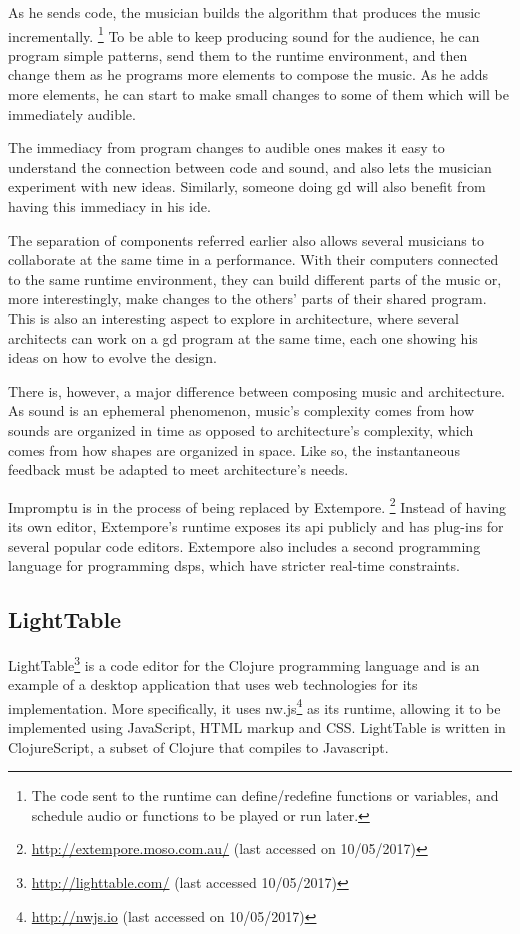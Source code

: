 As he sends code, the musician builds the algorithm that produces the music incrementally.%
\footnote{The code sent to the runtime can define/redefine functions or variables, and schedule audio or functions to be played or run later.}
To be able to keep producing sound for the audience, he can program simple patterns, send them to the runtime environment, and then change them as he programs more elements to compose the music.
As he adds more elements, he can start to make small changes to some of them which will be immediately audible.

The immediacy from program changes to audible ones makes it easy to understand the connection between code and sound, and also lets the musician experiment with new ideas.
Similarly, someone doing \gls{gd} will also benefit from having this immediacy in his \gls{ide}.

The separation of components referred earlier also allows several musicians to collaborate at the same time in a performance\cite{sorensen2005impromptu}.
With their computers connected to the same runtime environment, they can build different parts of the music or, more interestingly, make changes to the others' parts of their shared program.
This is also an interesting aspect to explore in architecture, where several architects can work on a \gls{gd} program at the same time, each one showing his ideas on how to evolve the design.

There is, however, a major difference between composing music and architecture.
As sound is an ephemeral phenomenon, music's complexity comes from how sounds are organized in time as opposed to architecture's complexity, which comes from how shapes are organized in space.
Like so, the instantaneous feedback must be adapted to meet architecture's needs.

Impromptu is in the process of being replaced by Extempore.%
\footnote{\url{http://extempore.moso.com.au/} (last accessed on 10/05/2017)}
Instead of having its own editor, Extempore's runtime exposes its \gls{api} publicly and has plug-ins for several popular code editors.
Extempore also includes a second programming language for programming \glspl{dsp}, which have stricter real-time constraints.



\subsection{LightTable}
\label{lighttable:related}
LightTable\footnote{\url{http://lighttable.com/} (last accessed 10/05/2017)} is a code editor for the Clojure programming language\cite{hickey2008clojure} and is an example of a desktop application that uses web technologies for its implementation.
More specifically, it uses nw.js\footnote{\url{http://nwjs.io} (last accessed on 10/05/2017)} as its runtime, allowing it to be implemented using JavaScript, HTML markup and CSS.
LightTable is written in ClojureScript\cite{10.1109/MIC.2011.148}, a subset of Clojure that compiles to Javascript.

